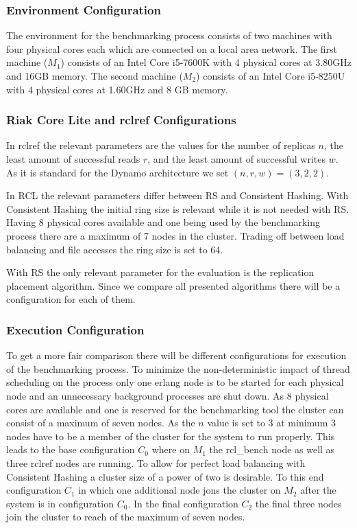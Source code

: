 \subsubsection{Environment Configuration}
The environment for the benchmarking process consists of two machines with four physical cores each which are connected on a local area network.
The first machine ($M_1$) consists of an Intel Core i5-7600K with 4 physical cores at 3.80GHz and 16GB memory.
The second machine ($M_2$) consists of an Intel Core i5-8250U with 4 physical cores at 1.60GHz and 8 GB memory.

\subsubsection{Riak Core Lite and rclref Configurations}
In rclref the relevant parameters are the values for the number of replicas $n$, the least amount of successful reads $r$, and the least amount of successful writes $w$.
As it is standard for the Dynamo architecture\cite{DeCandia2007} we set $(n, r, w) = (3, 2, 2)$.

In \ac{RCL} the relevant parameters differ between \ac{RS} and Consistent Hashing.
With Consistent Hashing the initial ring size is relevant while it is not needed with \ac{RS}.
Having 8 physical cores available and one being used by the benchmarking process there are a maximum of 7 nodes in the cluster.
Trading off between load balancing and file accesses the ring size is set to 64.

With \ac{RS} the only relevant parameter for the evaluation is the replication placement algorithm.
Since we compare all presented algorithms there will be a configuration for each of them.

\subsubsection{Execution Configuration}
To get a more fair comparison there will be different configurations for execution of the benchmarking process.
To minimize the non-deterministic impact of thread scheduling on the process only one erlang node is to be started for each physical node and an unnecessary background processes are shut down.
As 8 physical cores are available and one is reserved for the benchmarking tool the cluster can consist of a maximum of seven nodes.
As the $n$ value is set to 3 at minimum 3 nodes have to be a member of the cluster for the system to run properly.
This leads to the base configuration $C_0$ where on $M_1$ the rcl\_bench node as well as three rclref nodes are running.
To allow for perfect load balancing with Consistent Hashing a cluster size of a power of two is desirable.
To this end configuration $C_1$ in which one additional node jons the cluster on $M_2$ after the system is in configuration $C_0$.
In the final configuration $C_2$ the final three nodes join the cluster to reach of the maximum of seven nodes.

